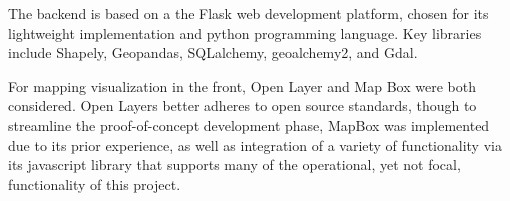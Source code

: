 The backend is based on a the Flask web development platform, chosen for its lightweight implementation and python programming language. Key libraries include Shapely, Geopandas, SQLalchemy, geoalchemy2, and Gdal.

For mapping visualization in the front, Open Layer and Map Box were both considered. Open Layers better adheres to open source standards, though to streamline the proof-of-concept development phase, MapBox was implemented due to its prior experience, as well as integration of a variety of functionality via its javascript library that supports many of the operational, yet not focal, functionality of this project.

